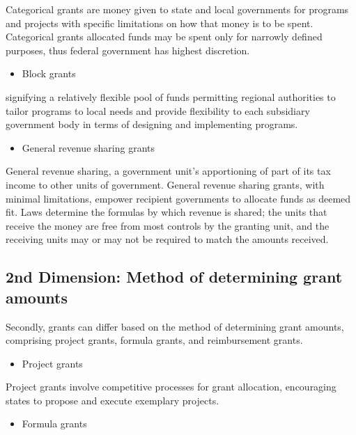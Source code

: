 Categorical grants are money given to state and local governments for programs and projects with specific limitations on how that money is to be spent.
Categorical grants allocated funds may be spent only for narrowly defined purposes, thus federal government has highest discretion.

\begin{itemize}
    \item{Block grants}
\end{itemize}

signifying a relatively flexible pool of funds permitting regional authorities to tailor programs to local needs and provide flexibility to each subsidiary government body in terms of designing and implementing programs\parencite{finegold2004block}.

\begin{itemize}
    \item{General revenue sharing grants}
\end{itemize}

General revenue sharing, a government unit's apportioning of part of its tax income to other units of government. General revenue sharing grants, with minimal limitations, empower recipient governments to allocate funds as deemed fit. Laws determine the formulas by which revenue is shared; the units that receive the money are free from most controls by the granting unit, and the receiving units may or may not be required to match the amounts received\parencite{larkey2015evaluating}.

\subsection{2nd Dimension: Method of determining grant amounts}

Secondly, grants can differ based on the method of determining grant amounts, comprising project grants, formula grants, and reimbursement grants.

\begin{itemize}
    \item{Project grants}
\end{itemize}

Project grants involve competitive processes for grant allocation, encouraging states to propose and execute exemplary projects.


\begin{itemize}
    \item{Formula grants}
\end{itemize}

